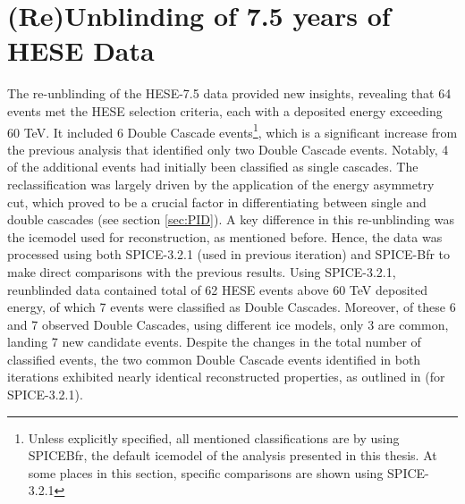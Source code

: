 \section{(Re)Unblinding of 7.5 years of HESE Data}
\label{sec:HESE7}
The re-unblinding of the HESE-7.5 data provided new insights, revealing that 64 events met the HESE selection criteria, each with a deposited energy exceeding 60 TeV. It included 6 Double Cascade events\footnote{Unless explicitly specified, all mentioned classifications are by using SPICEBfr, the default icemodel of the analysis presented in this thesis. At some places in this section, specific comparisons are shown using SPICE-3.2.1}, which is a significant increase from the previous analysis that identified only two Double Cascade events. Notably, 4 of the additional events had initially been classified as single cascades. The reclassification was largely driven by the application of the energy asymmetry cut, which proved to be a crucial factor in differentiating between single and double cascades (see section \ref{sec:PID}). A key difference in this re-unblinding was the icemodel used for reconstruction, as mentioned before. Hence, the data was processed using both SPICE-3.2.1 (used in previous iteration) and SPICE-Bfr to make direct comparisons with the previous results. Using SPICE-3.2.1, reunblinded data contained total of 62 HESE events above 60 TeV deposited energy, of which 7 events were classified as Double Cascades. Moreover, of these 6 and 7 observed Double Cascades, using different ice models, only 3 are common, landing 7 new candidate events. Despite the changes in the total number of classified events, the two common Double Cascade events identified in both iterations exhibited nearly identical reconstructed properties, as outlined in  (for SPICE-3.2.1).  %


                
